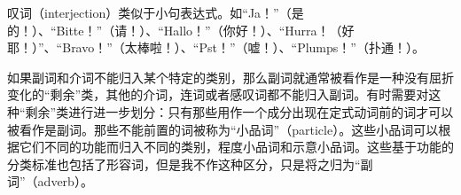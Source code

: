 叹词（interjection）类似于小句表达式。如“Ja！”（是的！）、“Bitte！”（请！）、“Hal\-lo！”（你好！）、“Hurra！（好耶！）”、“Bravo！”（太棒啦！）、“Pst！”（嘘！）、“Plumps！”（扑通！）。
 
如果副词和介词不能归入某个特定的类别，那么副词就通常被看作是一种没有屈折变化的“剩余”类，其他的介词，连词或者感叹词都不能归入副词。有时需要对这种“剩余”类进行进一步划分：只有那些用作一个成分出现在定式动词前的词才可以被看作是副词。那些不能前置的词被称为“小品词”（particle）。这些小品词可以根据它们不同的功能而归入不同的类别，\egc 程度小品词和示意小品词。这些基于功能的分类标准也包括了形容词，但是我不作这种区分，只是将之归为“副词”（adverb）。

